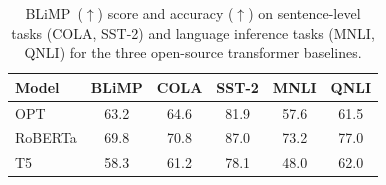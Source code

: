 \begin{table}[ht!]
\centering
\small
\setlength{\tabcolsep}{5pt} %
\begin{tabular}{l|c|cccc}
\toprule
\textbf{Model} & \textbf{BLiMP} & \textbf{COLA} & \textbf{SST-2} & \textbf{MNLI} & \textbf{QNLI} \\
\midrule
OPT & 63.2 & 64.6 & 81.9 & 57.6 & 61.5 \\
RoBERTa & 69.8 & 70.8 & 87.0 & 73.2 & 77.0 \\
T5 & 58.3 & 61.2 & 78.1 & 48.0 & 62.0 \\
\bottomrule
\end{tabular}
\caption{\label{tbl:opensource-baselines-nlu-results} BLiMP~($\uparrow$) score and accuracy ($\uparrow$) on sentence-level tasks (COLA, SST-2) and language inference tasks (MNLI, QNLI) for the three open-source transformer baselines.}
\end{table}
